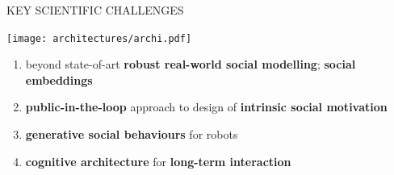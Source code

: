 \documentclass[xcolor=table]{beamer}
\begin{document}
%
%
%
%
%
%
%

\begin{frame}{KEY SCIENTIFIC CHALLENGES}
    \begin{center}
        \texttt{[image: architectures/archi.pdf]}
    \end{center}

    \begin{enumerate}
            \scriptsize
        \item beyond state-of-art \textbf{robust real-world social modelling}; \textbf{social embeddings}
        \item \textbf{public-in-the-loop} approach to design of \textbf{intrinsic social motivation}
        \item \textbf{generative social behaviours} for robots
        \item \textbf{cognitive architecture} for \textbf{long-term interaction}
    \end{enumerate}
\end{frame}
\end{document}
